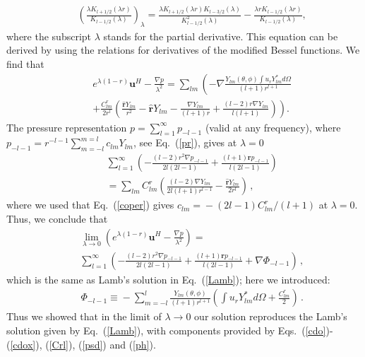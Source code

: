 \documentclass[aps,prx,twocolumn,amsmath,amssymb,amsfonts]{revtex4-2}
\begin{document}
\begin{eqnarray}&&\!\!
\left(\!\frac{\lambda K_{l+1/2}(\lambda r) }{ K_{l-1/2}(\lambda)}\!\right)_{\lambda}\!\!\!=\!\frac{\lambda K_{l+1/2}(\lambda r)K_{l-3/2}(\lambda) }{ K^2_{l-1/2}(\lambda)}\!-\!\frac{\lambda r K_{l-1/2}(\lambda r)}{K_{l-1/2}(\lambda)},\nonumber
\end{eqnarray}
where the subscript $\lambda$ stands for the partial derivative. This equation can be derived by using the relations for derivatives of the modified Bessel functions.
We find that
\begin{eqnarray}&&\!\!\!\!\!\!\!\!
e^{\lambda (1-r)} \bm u^H-\frac{\nabla p}{\lambda^2}=\sum_{lm}\left(-\nabla\frac{Y_{lm}(\theta, \phi)\int\! u_r Y_{lm}^* d\Omega}{(l+1)r^{l+1}}
\right.\nonumber\\&&\!\!\!\!\!\!\!\!\left.
+\frac{C^{r}_{lm}}{2r^l}\left(\frac{\bm{\hat r}Y_{lm}}{r^{2}}\! -\!\bm{\hat r}Y_{lm}
\!-\!\frac{\nabla Y_{lm}}{(l+1) r}\!+\!\frac{(l-2)r\nabla Y_{lm}}{l(l+1)}\right)\right).
\end{eqnarray}
The pressure representation $p=\sum_{l=1}^{\infty}p_{-l-1}$ (valid at any frequency), where $p_{-l-1}=r^{-l-1}\sum_{m=-l}^{m=l}c_{lm}Y_{lm}$, see Eq.~(\ref{pr}), gives at $\lambda=0$
\begin{eqnarray}&&\!\!\!\!\!\!\!
\sum_{l=1}^{\infty}\left(-\frac{(l-2)r^2\nabla p_{-l-1}}{2l(2l-1)}+\frac{(l+1)\bm r p_{-l-1}}{l(2l-1)}\right)
\nonumber\\&&\!\!\!\!\!\!\!=\sum_{lm}C^{r}_{lm}\left(\frac{(l-2)\nabla Y_{lm}}{2l(l+1)r^{l-1}}-\frac{\bm{\hat r} Y_{lm} }{2r^{l}}\right)\,, \label{psd}
\end{eqnarray}
where we used that Eq.~(\ref{coper}) gives $c_{lm}\!=\!-(2l-1)C^{r}_{lm}/(l\!+\!1)$ at $\lambda=0$. Thus, we conclude that
\begin{eqnarray}&&
\lim_{\lambda\to 0}\left(e^{\lambda (1-r)} \bm u^H-\frac{\nabla p}{\lambda^2}\right)=\\&&
\sum_{l=1}^{\infty}\left(-\frac{(l-2)r^2\nabla p_{-l-1}}{2l(2l-1)}+\frac{(l+1)\bm r p_{-l-1}}{l(2l-1)}+\nabla\Phi_{-l-1}\right)\,\nonumber ,
\end{eqnarray}
which is the same as Lamb's solution in Eq.~(\ref{Lamb}); here we introduced:
\begin{eqnarray}&&\!\!\!\!\!
\Phi_{-l-1}\!\equiv\! -\sum_{m=-l}^{l}\!\frac{Y_{lm}(\theta, \phi)}{ (l+1)r^{l+1}}
\left(\int\! u_r Y_{lm}^* d\Omega
\!+\!\frac{C^{r}_{lm}}{2}\right)\,.\label{ph}
\end{eqnarray}
Thus we showed that in the limit of $\lambda\to 0$ our solution reproduces the Lamb's solution given by Eq.~(\ref{Lamb}), with components provided by Eqs.~(\ref{cdo})-(\ref{cdox}), (\ref{Crl}), (\ref{psd}) and (\ref{ph}).
\end{document}
